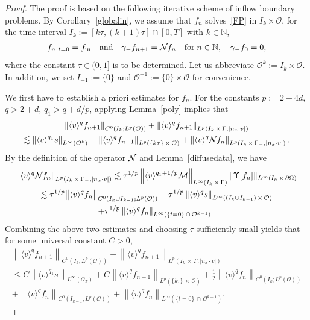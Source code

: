 \documentclass[AHL,Unicode,longabstracts,published]{cedram}
\newcommand*\p{\partial}
\newcommand*\fin {f_{\rm in}}
\newcommand*\N {\mathbb{N}}
\newcommand*\M {{\mathcal{M}}}
\newcommand*\NN {{\mathcal{N}\hspace{-.3mm}}}
\newcommand*\OO {\mathcal{O}}
\newcommand{\lv}{\langle v\rangle}
\begin{document}
\begin{proof}
The proof is based on the following iterative scheme of inflow boundary problems. By Corollary~\ref{globalin}, we assume that $f_n$ solves~\eqref{FP} in $I_k\times\OO$, for the time interval $I_k:=[k\tau,(k+1)\tau]\cap[0,T]$ with $k\in\N$,
\begin{align*}
f_n|_{t=0}=\fin\quad\text{and}\quad
\gamma_-f_{n+1}=\NN f_{n}\quad\text{for}\; n\in\N, \quad
\gamma_-f_0=0,
\end{align*}
where the constant $\tau\in(0,1]$ is to be determined. Let us abbreviate $\OO^k:=I_k\times\OO$. In addition, we set $I_{-1}:=\{0\}$ and $\OO^{-1}:=\{0\}\times\OO$ for convenience.

We first have to establish a priori estimates for $f_n$. For the constants $p:=2+4d$, $q>2+d$, $q_1>q+d/p$, applying Lemma~\ref{poly} implies that
\begin{multline*}
\left\|\lv^q f_{n+1}\right\|_{C^0\left(I_k;L^p(\OO)\right)} + \left\|\lv^q f_{n+1}\right\|_{L^p\left(I_k\,\times\,\Gamma,|n_x\cdot v|\right)}\\
\lesssim \left\|\lv^{q_1}s\right\|_{L^\infty\left(\OO^k\right)} + \left\|\lv^{q}f_{n+1}\right\|_{L^p(\{k\tau\}\,\times\,\OO)} + \left\|\lv^{q}\NN f_{n}\right\|_{L^p\left(I_k\,\times\,\Gamma_-,|n_x\cdot v|\right)}.
\end{multline*}
By the definition of the operator $\NN$ and Lemma~\ref{diffusedata}, we have
\begin{multline}\label{estb}
\left\|\lv^{q}\NN f_{n}\right\|_{L^p\left(I_k\,\times\,\Gamma_-,|n_x\cdot v|\right)}
\lesssim \tau^{1/p} \left\|\lv^{q_1+1/p}\M\right\|_{L^\infty\left(I_k\,\times\,\Gamma\right)} \|\Upsilon[f_{n}]\|_{L^\infty\left(I_k\,\times\,\p\Omega\right)}\\
\lesssim \tau^{1/p} \big\|\lv^{q} f_{n}\big\|_{C^0\left(I_k\cup I_{k-1};L^p(\OO)\right)} + \tau^{1/p} \left\|\lv^{q}s\right\|_{L^\infty\left(\left(I_k\cup I_{k-1}\right)\,\times\,\OO\right)}\\
+ \tau^{1/p} \left\|\lv^{q}f_{n}\right\|_{L^\infty\left(\{t=0\}\,\cap\,\OO^{k-1}\right)}.
\end{multline}
Combining the above two estimates and choosing $\tau$ sufficiently small yields that for some universal constant $C>0$,
\begin{multline}\label{estinb}
\left\|\lv^q f_{n+1}\right\|_{C^0\left(I_k;L^p(\OO)\right)} + \left\|\lv^q f_{n+1}\right\|_{L^p\left(I_k\,\times\,\Gamma,|n_x\cdot v|\right)} \\
\le C\left\|\lv^{q_1}s\right\|_{L^\infty(\OO_T)} + C
\left\|\lv^{q}f_{n+1}\right\|_{L^p\left(\{k\tau\}\,\times\,\OO\right)} + \frac{1}{2}\left\|\lv^{q} f_{n}\right\|_{C^0\left(I_k;L^p(\OO)\right)}\\
+ \left\|\lv^{q} f_{n}\right\|_{C^0\left(I_{k-1};L^p(\OO)\right)} + \left\|\lv^qf_{n}\right\|_{L^\infty\left(\{t=0\}\,\cap\,\OO^{k-1}\right)}.
\end{multline}


\end{proof}
\end{document}
